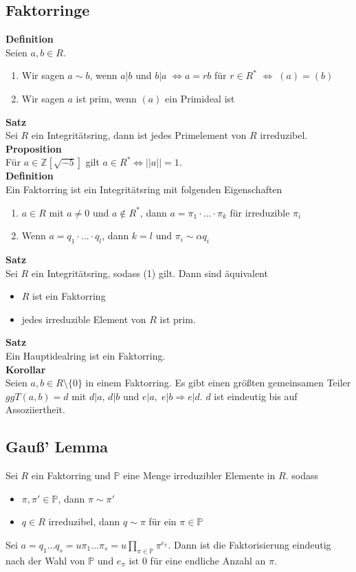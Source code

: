 \documentclass[a4paper, 12pt]{article}
\begin{document}
\subsection{Faktorringe}
\textbf{Definition}\\
Seien $a,b \in R$.  \begin{enumerate}
	\item Wir sagen $a \sim b$, wenn $a|b$ und $b|a$ $\Leftrightarrow a = rb$ für $r \in R^*$ $\Leftrightarrow \; (a) = (b)$
	\item Wir sagen $a$ ist prim, wenn $(a)$ ein Primideal ist
\end{enumerate}
\textbf{Satz}\\
Sei $R$ ein Integritätsring, dann ist jedes Primelement von $R$ irreduzibel.\\
\textbf{Proposition}\\
Für $a \in \mathbb{Z}[\sqrt{-5}]$ gilt $a \in R^* \Leftrightarrow \left|\left|a\right|\right| = 1$.\\
\textbf{Definition}\\
Ein Faktorring ist ein Integritätsring mit folgenden Eigenschaften \begin{enumerate}
	\item $a \in R$ mit $a\neq 0$ und $a \notin R^*$, dann $a = \pi_1\cdot ... \cdot \pi_k$ für irreduzible $\pi_i$
	\item Wenn $a = q_1 \cdot ... \cdot q_l$, dann $k = l$ und $\pi_i \sim \alpha q_i$
\end{enumerate}
\textbf{Satz}\\
Sei $R$ ein Integritätsring, sodass (1) gilt. Dann sind äquivalent
\begin{itemize}
	\item $R$ ist ein Faktorring
	\item jedes irreduzible Element von $R$ ist prim.
\end{itemize}
\textbf{Satz}\\
Ein Hauptidealring ist ein Faktorring.\\
\textbf{Korollar}\\
Seien $a,b \in R\setminus\{0\}$ in einem Faktorring. Es gibt einen größten gemeinsamen Teiler $ggT(a,b) = d$ mit $d | a$, $d | b$ und $e | a, \; e | b \Rightarrow e | d$. $d$ ist eindeutig bis auf Assoziiertheit.
\subsection{Gauß' Lemma}
Sei $R$ ein Faktorring und $\mathbb{P}$ eine Menge irreduzibler Elemente in $R$. sodass \begin{itemize}
	\item $\pi, \pi' \in \mathbb{P}$, dann $\pi \sim \pi'$
	\item $q \in R$ irreduzibel, dann $q \sim \pi$ für ein $\pi \in \mathbb{P}$
\end{itemize}
Sei $a = q_1 ... q_s = u \pi_1 ... \pi_s = u\prod_{\pi \in \mathbb{P}} \pi^{e_\pi}$. Dann ist die Faktorisierung eindeutig nach der Wahl von $\mathbb{P}$ und $e_\pi$ ist 0 für eine endliche Anzahl an $\pi$.\\
\end{document}
